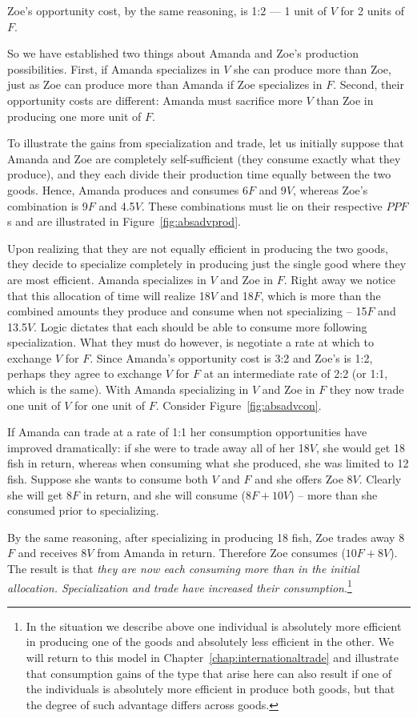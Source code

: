 Zoe's opportunity cost, by the same reasoning, is 1:2 --- 1 unit of $V$ for 2 units of $F$. 

So we have established two things about Amanda and Zoe's production possibilities. First, if Amanda specializes in $V$ she can produce more than Zoe, just as Zoe can produce more than Amanda if Zoe specializes in $F$. Second, their opportunity costs are different: Amanda must sacrifice more $V$ than Zoe in producing one more unit of $F$.

To illustrate the gains from specialization and trade, let us initially suppose that Amanda and Zoe are completely self-sufficient (they consume exactly what they produce), and they each divide their production time equally between the two goods. Hence, Amanda produces and consumes 6$F$ and 9$V$, whereas Zoe's combination is 9$F$ and 4.5$V$. These combinations must lie on their respective $PPF$s and are illustrated in Figure~\ref{fig:absadvprod}.

Upon realizing that they are not equally efficient in producing the two goods, they decide to specialize completely in producing just the single good where they are most efficient. Amanda specializes in $V$ and Zoe in $F$. Right away we notice that this allocation of time will realize 18$V$ and 18$F$, which is more than the combined amounts they produce and consume when not specializing -- 15$F$ and 13.5$V$. Logic dictates that each should be able to consume more following specialization. What they must do however, is negotiate a rate at which to exchange $V$ for $F$. Since Amanda's opportunity cost is 3:2 and Zoe's is 1:2, perhaps they agree to exchange $V$ for $F$ at an intermediate rate of 2:2 (or 1:1, which is the same). With Amanda specializing in $V$ and Zoe in $F$ they now trade one unit of $V$ for one unit of $F$. Consider Figure~\ref{fig:absadvcon}.



If Amanda can trade at a rate of 1:1 her consumption opportunities have improved dramatically: if she were to trade away all of her 18$V$, she would get 18 fish in return, whereas when consuming what she produced, she was limited to 12 fish. Suppose she wants to consume both $V$ and $F$ and she offers Zoe 8$V$. Clearly she will get 8$F$ in return, and she will consume ($8F + 10V$) -- more than she consumed prior to specializing. 

By the same reasoning, after specializing in producing 18 fish, Zoe trades away 8$F$ and receives 8$V$ from Amanda in return. Therefore Zoe consumes ($10F + 8V$). The result is that \textit{they are now each consuming more than in the initial allocation. Specialization and trade have increased their consumption}.\footnote{In the situation we describe above one individual is absolutely more efficient in producing one of the goods and absolutely less efficient in the other. We will return to this model in Chapter~\ref{chap:internationaltrade} and illustrate that consumption gains of the type that arise here can also result if one of the individuals is absolutely more efficient in produce both goods, but that the degree of such advantage differs across goods.}
